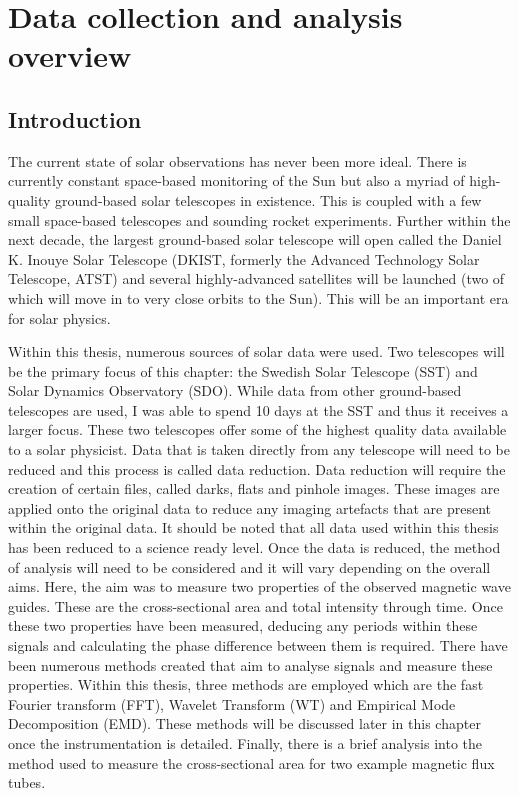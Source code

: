 \graphicspath{{Chapter2/Figs/}}

\chapter{Data collection and analysis overview}
\label{chapter2}
	
	\vspace*{\fill}\par
    \pagebreak
	 
\section{Introduction}

	The current state of solar observations has never been more ideal.
	There is currently constant space-based monitoring of the Sun but also a myriad of high-quality ground-based solar telescopes in existence.
    This is coupled with a few small space-based telescopes and sounding rocket experiments.
	Further within the next decade, the largest ground-based solar telescope will open called the Daniel K. Inouye Solar Telescope (DKIST, formerly the Advanced Technology Solar Telescope, ATST) and several highly-advanced satellites will be launched (two of which will move in to very close orbits to the Sun).
	This will be an important era for solar physics.
	
	Within this thesis, numerous sources of solar data were used.
	Two telescopes will be the primary focus of this chapter: the Swedish Solar Telescope (SST) and Solar Dynamics Observatory (SDO).
	While data from other ground-based telescopes are used, I was able to spend 10 days at the SST and thus it receives a larger focus.
	These two telescopes offer some of the highest quality data available to a solar physicist.
	Data that is taken directly from any telescope will need to be reduced and this process is called data reduction. 
	Data reduction will require the creation of certain files, called darks, flats and pinhole images.
	These images are applied onto the original data to reduce any imaging artefacts that are present within the original data.
	It should be noted that all data used within this thesis has been reduced to a science ready level.
	Once the data is reduced, the method of analysis will need to be considered and it will vary depending on the overall aims.
	Here, the aim was to measure two properties of the observed magnetic wave guides.
    These are the cross-sectional area and total intensity through time.
    Once these two properties have been measured, deducing any periods within these signals and calculating the phase difference between them is required.
    There have been numerous methods created that aim to analyse signals and measure these properties.
    Within this thesis, three methods are employed which are the fast Fourier transform (FFT), Wavelet Transform (WT) and Empirical Mode Decomposition (EMD).  
    These methods will be discussed later in this chapter once the instrumentation is detailed.
    Finally, there is a brief analysis into the method used to measure the cross-sectional area for two example magnetic flux tubes.
	
